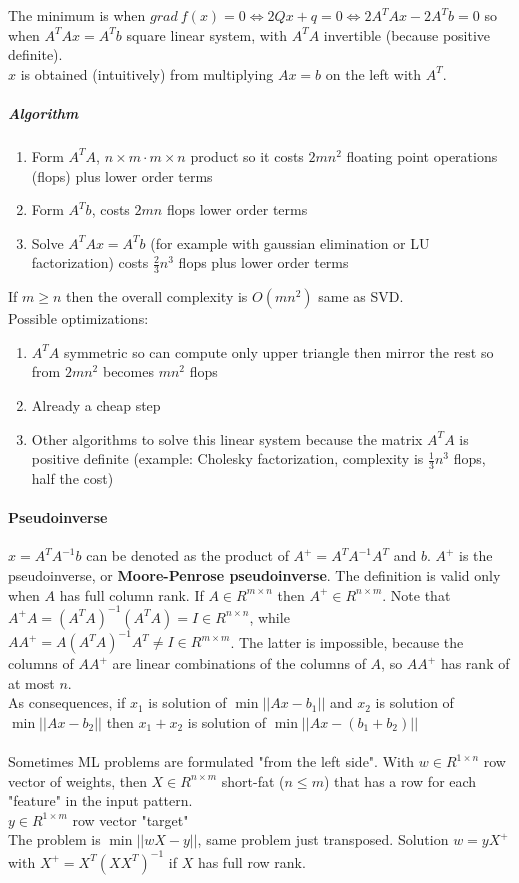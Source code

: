 \documentclass[10pt]{report}
\begin{document}
The minimum is when $grad\:f(x) = 0 \Leftrightarrow 2Qx + q = 0 \Leftrightarrow 2A^TAx - 2A^Tb = 0$ so when $A^TAx = A^Tb$ square linear system, with $A^TA$ invertible (because positive definite).\\
$x$ is obtained (intuitively) from multiplying $Ax=b$ on the left with $A^T$.
\subparagraph{Algorithm}
\begin{enumerate}
	\item Form $A^TA$, $n\times m\cdot m\times n$ product so it costs $2mn^2$ floating point operations (flops) plus lower order terms
	\item Form $A^Tb$, costs $2mn$ flops lower order terms
	\item Solve $A^TAx = A^Tb$ (for example with gaussian elimination or LU factorization) costs $\frac{2}{3}n^3$ flops plus lower order terms
\end{enumerate}
If $m \geq n$ then the overall complexity is $O(mn^2)$ same as SVD.\\
Possible optimizations:
\begin{enumerate}
	\item $A^TA$ symmetric so can compute only upper triangle then mirror the rest so from $2mn^2$ becomes $mn^2$ flops
	\item Already a cheap step
	\item Other algorithms to solve this linear system because the matrix $A^TA$ is positive definite (example: Cholesky factorization, complexity is $\frac{1}{3}n^3$ flops, half the cost)
\end{enumerate}
\paragraph{Pseudoinverse} $x = A^TA^{-1}b$ can be denoted as the product of $A^+ = A^TA^{-1}A^T$ and $b$. $A^+$ is the pseudoinverse, or \textbf{Moore-Penrose pseudoinverse}. The definition is valid only when $A$ has full column rank. If $A\in R^{m\times n}$ then $A^+ \in R^{n\times m}$. Note that $A^+A = (A^TA)^{-1}(A^TA) = I\in R^{n\times n}$, while $AA^+ = A(A^TA)^{-1}A^T \neq I\in R^{m\times m}$. The latter is impossible, because the columns of $AA^+$ are linear combinations of the columns of $A$, so $AA^+$ has rank of at most $n$.\\
As consequences, if $x_1$ is solution of $\min||Ax - b_1||$ and $x_2$ is solution of $\min||Ax - b_2||$ then $x_1+x_2$ is solution of $\min||Ax - (b_1 + b_2)||$\\\\Sometimes ML problems are formulated "from the left side". With $w\in R^{1\times n}$ row vector of weights, then $X\in R^{n\times m}$ short-fat ($n\leq m$) that has a row for each "feature" in the input pattern.\\
$y \in R^{1\times m}$ row vector "target"\\
The problem is $\min||wX - y||$, same problem just transposed. Solution $w = yX^+$ with $X^+ = X^T(XX^T)^{-1}$ if $X$ has full row rank.
\end{document}
